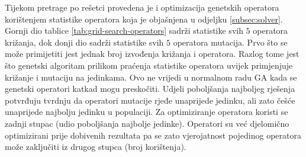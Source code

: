 \documentclass[times, utf8, diplomski]{fer}
\begin{document}
\begin{table}
\begin{tabular}
	\end{tabular}
\end{table}

Tijekom pretrage po rešetci provedena je i optimizacija genetskih operatora korištenjem statistike operatora koja je objašnjena u odjeljku \ref{subsec:solver}. Gornji dio tablice \ref{tab:grid-search-operators} sadrži statistike svih $5$ operatora križanja, dok donji dio sadrži statistike svih $5$ operatora mutacija. Prvo što se može primijetiti jest jednak broj izvođenja križanja i operatora. Razlog tome jest što genetski algoritam prilikom praćenja statistike operatora uvijek primjenjuje križanje i mutaciju na jedinkama. Ovo ne vrijedi u normalnom radu GA kada se genetski operatori katkad mogu preskočiti. Udjeli poboljšanja najboljeg rješenja potvrđuju tvrdnju da operatori mutacije rjeđe unaprijede jedinku, ali zato češće unaprijede najbolju jedinku u populaciji. Za optimiziranje operatora koristi se zadnji stupac (udio poboljšanja najbolje jedinke). Operatori su već djelomično optimizirani prije dobivenih rezultata pa se zato vjerojatnost pojedinog operatora može zaključiti iz drugog stupca (broj korištenja).
\end{document}

